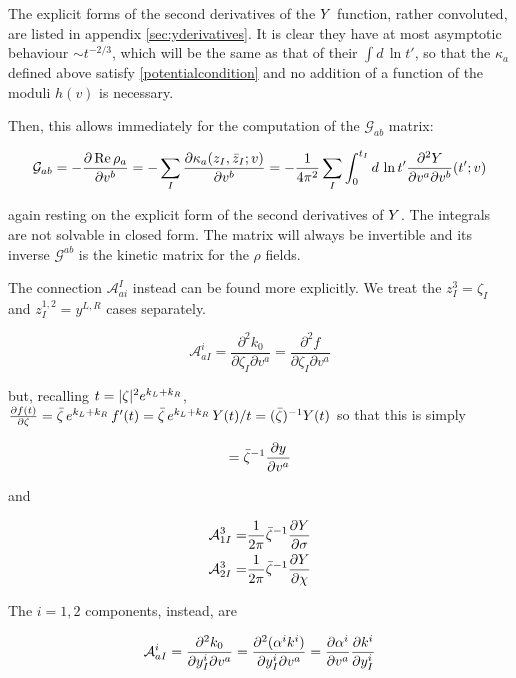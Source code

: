 The explicit forms of the second derivatives of the $Y$ function, rather convoluted, are listed in appendix \ref{sec:yderivatives}. It is clear they have at most asymptotic behaviour $\sim t^{-2/3}$, which will be the same as that of their $\int d\,\ln t'$, so that the $\kappa_a$ defined above satisfy \eqref{potentialcondition} and no addition of a function of the moduli $h(v)$ is necessary.

Then, this allows immediately for the computation of the $\mathcal{G}_{ab}$ matrix:

\begin{equation}
	\mathcal{G}_{ab} = - \frac{\partial\operatorname{Re} \rho_a}{\partial v^b}  = - \sum_I \frac{\partial \kappa_a(z_I,\bar z_I; v)}{\partial v^b} = - \frac{1}{4\pi^2} \sum_I \int_0^{t_I} d\,\ln t' \frac{\partial^2 Y}{\partial v^a \partial v^b} (t' ; v)
	\label{Gfinal}
\end{equation}

again resting on the explicit form of the second derivatives of $Y$. The integrals are not solvable in closed form. The matrix will always be invertible and its inverse $\mathcal{G}^{ab}$ is the kinetic matrix for the $\rho$ fields.

The connection $\mathcal{A}_{ai}^I$ instead can be found more explicitly. We treat the $z_I^3 = \zeta_I$ and $z_I^{1,2} = y^{L,R}$ cases separately.

\begin{equation}
	\mathcal{A}_{aI}^i = \frac{\partial^2 k_0}{\partial \zeta_I \partial v^a} = \frac{\partial^2 f}{\partial \zeta_I \partial v^a}
	\label{}
\end{equation}

but, recalling $t = |\zeta|^2 e^{k_L + k_R}$, $\frac{\partial f(t)}{\partial\zeta} = \bar \zeta \, e^{k_L + k_R} \, f'(t) =\bar \zeta \, e^{k_L + k_R} \, Y(t)/t = (\bar \zeta)^{-1} Y(t)$ so that this is simply

\begin{equation}
	= \bar \zeta^{-1} \frac{\partial y}{\partial v^a}	\label{}
\end{equation}

and

\begin{align}
	\mathcal{A}_{1I}^3 =& \frac{1}{2\pi} \bar \zeta^{-1} \frac{\partial Y}{\partial\sigma}\\
	\mathcal{A}_{2I}^3 =& \frac{1}{2\pi} \bar \zeta^{-1} \frac{\partial Y}{\partial\chi}
	\label{Afinal3}
\end{align}

The $i=1,2$ components, instead, are

\begin{equation}
	\mathcal{A}_{aI}^i = \frac{\partial^2 k_0}{\partial y_I^i \partial v^a} = \frac{\partial^2 (\alpha^i k^i)}{\partial y_I^i \partial v^a}  = \frac{\partial\alpha^i}{\partial v^a} \frac{\partial k^i}{\partial y_I^i}
	\label{Afinal12}
\end{equation}


